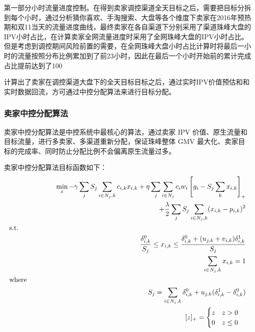 第一部分小时流量进度控制。在得到卖家调控渠道全天目标之后，需要把目标分拆到每个小时，通过分析猜你喜欢、手淘搜索、大盘等各个维度下卖家在2016年预热期和双11当天的流量进度曲线，最终卖家在各自渠道下分别采用了渠道珠峰大盘的IPV小时占比，在计算卖家全网流量进度时采用了全网珠峰大盘的IPV小时占比。但是考虑到调控期间风险前置的需要，在全网珠峰大盘小时占比计算时将最后一小时的流量按照分布比例累加到了前23小时，因此在最后一个小时开始前的累计完成占比提前达到了100%

计算出了卖家在调控渠道大盘下的全天目标目标之后，通过实时IPV价值预估和和实时数据回流，方可通过中控分配算法来进行目标分配。

\subsubsection{卖家中控分配算法}
卖家中控分配算法是中控系统中最核心的算法，通过卖家 IPV 价值、原生流量和目标流量，进行多卖家、多渠道重新分配，保证珠峰整体 GMV 最大化、卖家目标的完成率、同时防止分配比例不会偏离原生流量过多。

卖家中控分配算法目标函数如下：
\begin{align}
\min_x - \gamma \sum_jS_j \sum_{i\in N_j,k} c_{i,k} x_{i,k}  + \eta \sum_j \sum_{i \in N_j} c_i w_i  \left [g_i - S_j \sum_k x_{i,k} \right]_{+} \\
+ \frac{\lambda}{2} \sum_j S_j \sum_{i \in N_j,k}(x_{i,k}-p_{i,k})^2 \\
\leftline{s.t.} \\
\frac{\delta_{i,k}^{0}}{S_j} \leq x_{i,k} \leq \frac{\delta_{i,k}^0 + (u_{j,k} + v_{i,k}) \delta_{i,k}^1}{S_j} \\
\sum_{i \in N_j,k} x_{i,k}=1 \\
\leftline{where} \\
S_j=\sum_{i \in N_j,k} \delta_{i,k}^{0} + u_{j,k}(\delta_{i,k}^1-\delta_{i,k}^0) \\
[z]_+= \begin{cases}  
z \quad z>0 \\
0 \quad z \leq 0
\end{cases}
\end{align}

